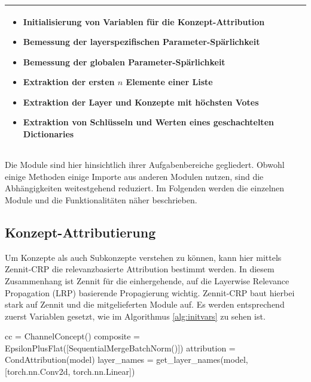 \begin{table}[ht!]
{\begin{tabular}{|m{4.5cm} | m{6.2cm} | m{12.5cm}|}
 \begin{itemize}
\itemsep=5pt 
    \item  Initialisierung von Variablen für die Konzept-Attribution
    \item Bemessung der layerspezifischen Parameter-Spärlichkeit
    \item Bemessung der globalen Parameter-Spärlichkeit
    \item Extraktion der ersten {$n$} Elemente einer Liste
        \item Extraktion der Layer und Konzepte mit höchsten Votes
    \item Extraktion von Schlüsseln und Werten eines geschachtelten Dictionaries

\end{itemize} 

\\  \hline

\end{tabular}
%
}
 \label{tab:module} 
\end{table}

Die Module sind hier hinsichtlich ihrer Aufgabenbereiche gegliedert. Obwohl einige Methoden einige Importe aus anderen Modulen nutzen, sind die Abhängigkeiten weitestgehend reduziert. Im Folgenden werden die einzelnen Module und die Funktionalitäten näher beschrieben.

\subsection{Konzept-Attributierung}

Um Konzepte als auch Subkonzepte verstehen zu können, kann hier mittels Zennit-CRP \cite{achtibat2022crpzennit} die relevanzbasierte Attribution bestimmt werden. In diesem Zusammenhang ist Zennit \cite{anders2021software} für die einhergehende, auf die Layerwise Relevance Propagation (LRP) basierende Propagierung wichtig. Zennit-CRP baut hierbei stark auf Zennit und die mitgelieferten Module auf.
Es werden entsprechend zuerst Variablen gesetzt, wie im Algorithmus \ref{alg:initvars} zu sehen ist.

\begin{python}[caption={Initialisierung der Variablen für die Berechnung der Konzept-Relevanzen (Auszug aus der Methode \lstinline{init_attribution_vars()})}, label=alg:initvars]
cc = ChannelConcept()
composite = EpsilonPlusFlat([SequentialMergeBatchNorm()])
attribution = CondAttribution(model) 
layer_names = get_layer_names(model, [torch.nn.Conv2d, torch.nn.Linear])
\end{python}


